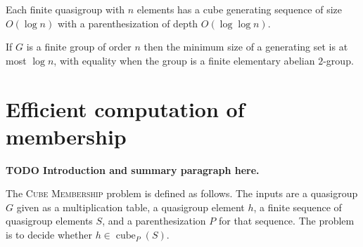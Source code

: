 \documentclass{article}
\newcommand{\todo}[1]{\textbf{TODO #1}}
\newcommand{\gen}[1]{\langle #1 \rangle}
\DeclareMathOperator{\cube}{cube}
\begin{document}
\begin{lemma}\label{lem:small}
  Each finite quasigroup with $n$ elements has a cube generating sequence of size $O(\log n)$ with a parenthesization of depth $O(\log \log n)$.
\end{lemma}

\begin{lemma}\label{lem:log}
  If $G$ is a finite group of order $n$ then the minimum size of a generating set is at most $\log n$, with equality when the group is a finite elementary abelian $2$-group.
\end{lemma}


\section{Efficient computation of membership}

\todo{Introduction and summary paragraph here.}

The \textsc{Cube Membership} problem is defined as follows.
The inputs are a quasigroup $G$ given as a multiplication table, a quasigroup element $h$, a finite sequence of quasigroup elements $S$, and a parenthesization $P$ for that sequence.
The problem is to decide whether $h \in \cube_P(S)$.
\end{document}

